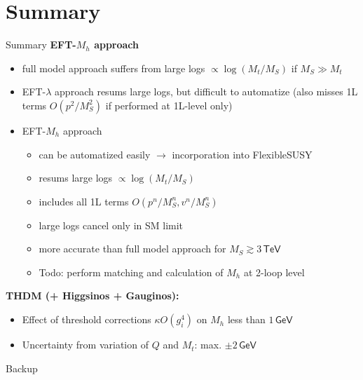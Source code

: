 \documentclass[hyperref={pdfpagelabels=false},ngerman]{beamer}
\newcommand{\eh}[1]{\,\mathsf{#1}}
\renewcommand{\emph}{\textbf}
\begin{document}

\section{Summary}

\begin{frame}{Summary}
  \emph{EFT-$M_h$ approach}
  \begin{itemize}
  \item full model approach suffers from large logs
    $\propto\log(M_t/M_S)$ if $M_S \gg M_t$
  \item EFT-$\lambda$ approach resums large logs, but difficult to
    automatize (also misses 1L terms $O(p^2/M_S^2)$ if performed at
    1L-level only)
  \item EFT-$M_h$ approach
    \begin{itemize}
    \item can be automatized easily $\rightarrow$ incorporation into
      FlexibleSUSY
    \item resums large logs $\propto\log(M_t/M_S)$
    \item includes all 1L terms $O(p^n/M_S^n, v^n/M_S^n)$
    \item large logs cancel only in SM limit
    \item more accurate than full model approach for $M_S \gtrsim 3\eh{TeV}$
    \item Todo: perform matching and calculation of $M_h$ at 2-loop level
    \end{itemize}
  \end{itemize}
  \emph{THDM (+ Higgsinos + Gauginos):}
  \begin{itemize}
  \item Effect of threshold corrections $\kappa O(g_i^4)$ on $M_h$
    less than $1\eh{GeV}$
  \item Uncertainty from variation of $Q$ and $M_t$: max. $\pm 2\eh{GeV}$
  \end{itemize}
\end{frame}


\begin{frame}[noframenumbering]
  \begin{center}
    \Huge Backup
  \end{center}
\end{frame}

\end{document}
